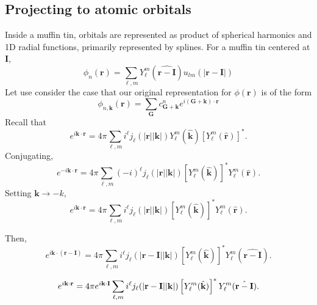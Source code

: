 \subsection{Projecting to atomic orbitals}


\renewcommand{\vr}{\mathbf{r}}
\newcommand{\vI}{\mathbf{I}}
\renewcommand{\vk}{\mathbf{k}}
\newcommand{\vG}{\mathbf{G}}

Inside a muffin tin, orbitals are represented as product of spherical
harmonics and 1D radial functions, primarily represented by splines.
For a muffin tin centered at $\vI$, 
\begin{equation}
\phi_n(\vr) = \sum_{\ell,m} Y_\ell^m(\hat{\vr -\vI})
u_{lm}\left(\left|\vr - \vI\right|\right) \label{eq:ulm}
\end{equation}
Let use consider the case that our original representation for
$\phi(\vr)$ is of the form
\begin{equation}
\phi_{n,\vk}(\vr) = \sum_\vG c_{\vG+\vk}^n e^{i(\vG + \vk)\cdot \vr}
\end{equation}
Recall that
\begin{equation}
e^{i\vk\cdot\vr} = 4\pi \sum_{\ell,m} i^\ell j_\ell(|\vr||\vk|)
Y_\ell^m(\hat{\vk}) \left[Y_\ell^m(\hat{\vr})\right]^*.
\end{equation}
Conjugating,
\begin{equation}
e^{-i\vk\cdot\vr} = 4\pi\sum_{\ell,m} (-i)^\ell j_\ell(|\vr||\vk|)
\left[Y_\ell^m(\hat{\vk})\right]^* Y_\ell^m(\hat{\vr}).
\end{equation}
Setting $\vk \rightarrow -k$,
\begin{equation}
e^{i\vk\cdot\vr} = 4\pi\sum_{\ell,m} i^\ell j_\ell(|\vr||\vk|)
\left[Y_\ell^m(\hat{\vk})\right]^* Y_\ell^m(\hat{\vr}).
\end{equation}

Then,
\begin{equation}
e^{i\vk\cdot(\vr-\vI)} = 4\pi\sum_{\ell,m} i^\ell j_\ell(|\vr-\vI||\vk|)
\left[Y_\ell^m(\hat{\vk})\right]^* Y_\ell^m(\hat{\vr-\vI}).
\end{equation}

\begin{equation}
e^{i\vk\cdot\vr} = 4\pi e^{i\vk\cdot\vI} \-\sum_{\ell,m} i^\ell j_\ell(|\vr-\vI||\vk|)
\left[Y_\ell^m(\hat{\vk})\right]^* Y_\ell^m(\hat{\vr-\vI}).
\end{equation}

